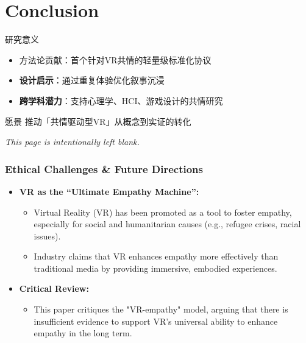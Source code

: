 \documentclass[aspectratio=169,xcolor=dvipsnames]{beamer}
\begin{document}
\section{Conclusion}

\begin{frame}{研究意义}
    \begin{itemize}
        \item \alert{方法论贡献}：首个针对VR共情的轻量级标准化协议
        \item \textbf{设计启示}：通过重复体验优化叙事沉浸
        \item \textbf{跨学科潜力}：支持心理学、HCI、游戏设计的共情研究
    \end{itemize}
    
    \begin{block}{愿景}
        推动「共情驱动型VR」从概念到实证的转化
    \end{block}
\end{frame}


\begin{frame}
    \begin{center}
        \textit{This page is intentionally left blank.}
    \end{center}
\end{frame}


\begin{frame}
\frametitle{Ethical Challenges \& Future Directions}
\begin{itemize}
    \item \textbf{VR as the “Ultimate Empathy Machine”:}
    \begin{itemize}
        \item Virtual Reality (VR) has been promoted as a tool to foster empathy, especially for social and humanitarian causes (e.g., refugee crises, racial issues).
        \item Industry claims that VR enhances empathy more effectively than traditional media by providing immersive, embodied experiences.
    \end{itemize}
    \item \textbf{Critical Review:}
    \begin{itemize}
        \item This paper critiques the "VR-empathy" model, arguing that there is insufficient evidence to support VR's universal ability to enhance empathy in the long term.
    \end{itemize}
\end{itemize}
\end{frame}
\end{document}
